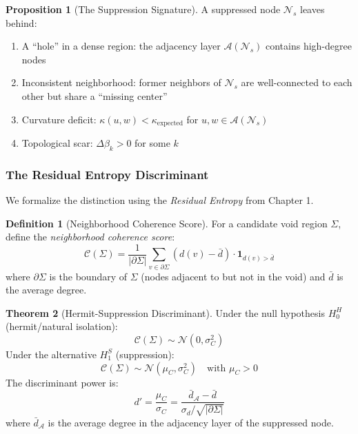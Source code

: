 \documentclass[12pt,a4paper]{article}
\theoremstyle{definition}
\newtheorem{definition}{Definition}[section]
\newtheorem{theorem}{Theorem}[section]
\newtheorem{proposition}[theorem]{Proposition}
\theoremstyle{remark}
\newcommand{\NS}{\mathcal{N}_s}          %
\newcommand{\CA}{\mathcal{A}}            %
\begin{document}
\begin{proposition}[The Suppression Signature]
A suppressed node $\NS$ leaves behind:
\begin{enumerate}
    \item A ``hole'' in a dense region: the adjacency layer $\CA(\NS)$ contains high-degree nodes
    \item Inconsistent neighborhood: former neighbors of $\NS$ are well-connected to each other but share a ``missing center''
    \item Curvature deficit: $\kappa(u, w) < \kappa_{\text{expected}}$ for $u, w \in \CA(\NS)$
    \item Topological scar: $\Delta\beta_k > 0$ for some $k$
\end{enumerate}
\end{proposition}

\subsubsection{The Residual Entropy Discriminant}

We formalize the distinction using the \emph{Residual Entropy} from Chapter 1.

\begin{definition}[Neighborhood Coherence Score]
For a candidate void region $\Sigma$, define the \emph{neighborhood coherence score}:
\begin{equation}
    \boxed{
    \mathcal{C}(\Sigma) = \frac{1}{|\partial\Sigma|} \sum_{v \in \partial\Sigma} \left( d(v) - \bar{d} \right) \cdot \mathbf{1}_{d(v) > \bar{d}}
    }
\end{equation}
where $\partial\Sigma$ is the boundary of $\Sigma$ (nodes adjacent to but not in the void) and $\bar{d}$ is the average degree.
\end{definition}

\begin{theorem}[Hermit-Suppression Discriminant]
\label{thm:hermit-test}
Under the null hypothesis $H_0^H$ (hermit/natural isolation):
\begin{equation}
    \mathcal{C}(\Sigma) \sim \mathcal{N}(0, \sigma_C^2)
\end{equation}
Under the alternative $H_1^S$ (suppression):
\begin{equation}
    \mathcal{C}(\Sigma) \sim \mathcal{N}(\mu_C, \sigma_C^2) \quad \text{with } \mu_C > 0
\end{equation}
The discriminant power is:
\begin{equation}
    d' = \frac{\mu_C}{\sigma_C} = \frac{\bar{d}_{\CA} - \bar{d}}{\sigma_d / \sqrt{|\partial\Sigma|}}
\end{equation}
where $\bar{d}_{\CA}$ is the average degree in the adjacency layer of the suppressed node.
\end{theorem}
\end{document}
